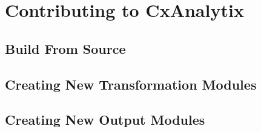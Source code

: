\chapter{Contributing to CxAnalytix}

\section{Build From Source}

\section{Creating New Transformation Modules}

\section{Creating New Output Modules}
